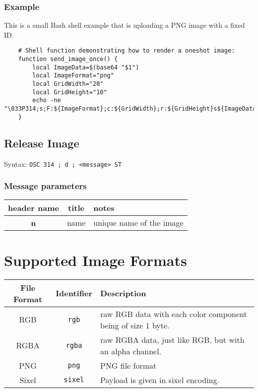 \documentclass[a4paper]{article}
\newcommand{\code}[1]{\colorbox{light-gray}{\texttt{#1}}}
\begin{document}
\subsubsection*{Example}

This is a small Bash shell example that is uploading a PNG image with a fixed ID.

\begin{verbatim}
    # Shell function demonstrating how to render a oneshot image:
    function send_image_once() {
        local ImageData=$(base64 "$1")
        local ImageFormat="png"
        local GridWidth="20"
        local GridHeight="10"
        echo -ne "\033P314;s;F:${ImageFormat};c:${GridWidth};r:${GridHeight}s${ImageData}\033\\"
    }
\end{verbatim}

\subsection{Release Image} %

Syntax: \code{OSC 314 ; d ; <message> ST}

\subsubsection*{Message parameters}

\begin{tabular}{ |c|c|l| }
    \hline
    \textbf{header name}   & \textbf{title}   & \textbf{notes} \\
    \hline
    \textbf{n}             & name             & unique name of the image \\
    \hline
\end{tabular}

\section{Supported Image Formats} %

\label{sec:supported-image-formtats}

\begin{tabular}{c | c | l}
    File Format & Identifier     & Description \\
    \hline
    RGB         & \code{rgb}     & raw RGB data with each color component being of size 1 byte. \\
    RGBA        & \code{rgba}    & raw RGBA data, just like RGB, but with an alpha channel. \\
    PNG         & \code{png}     & PNG file format \\
    Sixel       & \code{sixel}   & Payload is given in sixel encoding. \\
    \hline
\end{tabular}
\end{document}

